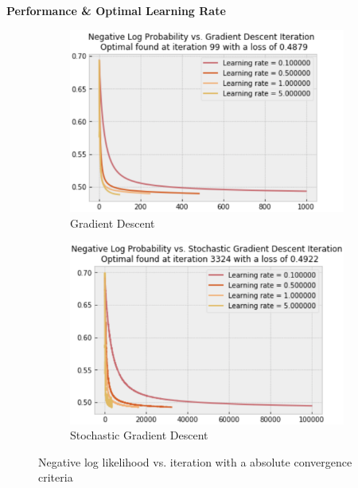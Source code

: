 \documentclass{article} %
\begin{document}
\vspace{0.2cm}
\textbf{Performance \& Optimal Learning Rate}
  \begin{figure}[!h]
    \centering
    \begin{subfigure}[b]{0.45\linewidth}
      \includegraphics[width=\linewidth]{A3_2_1.png}
      \caption{Gradient Descent}
    \end{subfigure}
    \begin{subfigure}[b]{0.45\linewidth}
      \includegraphics[width=\linewidth]{A3_2_2.png}
      \caption{Stochastic Gradient Descent}
    \end{subfigure}
    \caption{Negative log likelihood vs. iteration with a absolute convergence criteria}
    \label{fig:Q1_2}
  \end{figure}
\end{document}
